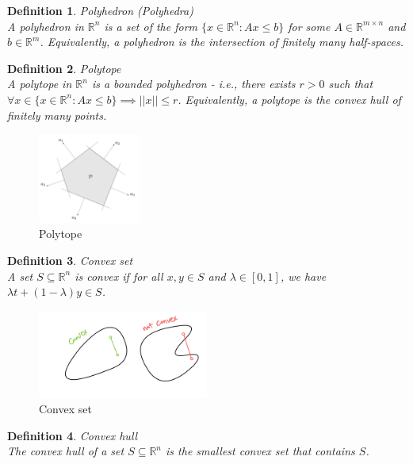\documentclass[11pt]{book} %
\newtheorem{definition}{Definition}[section]
\begin{document}
\begin{definition}{Polyhedron (Polyhedra)} \\
A polyhedron in $\mathbb{R}^n$ is a set of the form $\{x \in \mathbb{R}^n : Ax \leq b\}$ for some $A \in \mathbb{R}^{m \times n}$ and $b \in \mathbb{R}^m$.
Equivalently, a polyhedron is the intersection of finitely many half-spaces.
\end{definition}

\begin{definition}{Polytope} \\
A polytope in $\mathbb{R}^n$ is a bounded polyhedron - i.e., there exists $r > 0$ such that $\forall x \in \{x \in \mathbb{R}^n : Ax \leq b\} \implies ||x|| \leq r$.
Equivalently, a polytope is the convex hull of finitely many points.
\end{definition}

\begin{figure}[H]
    \centering
    \includegraphics[width=0.3\textwidth]{Figs/polyhedron.png}
    \caption{Polytope}
\end{figure}

\begin{definition}{Convex set} \\
    A set $S \subseteq \mathbb{R}^n$ is convex if for all $x,y \in S$ and $\lambda \in [0,1]$, we have $\lambda t + (1- \lambda)y \in S$.
\end{definition}    

\begin{figure}[H]
    \centering
    \includegraphics[width=0.5\textwidth]{Figs/convex_set.png}
    \caption{Convex set}
\end{figure}

\begin{definition}{Convex hull} \\
The convex hull of a set $S \subseteq \mathbb{R}^n$ is the smallest convex set that contains $S$.
\end{definition}
\end{document}
